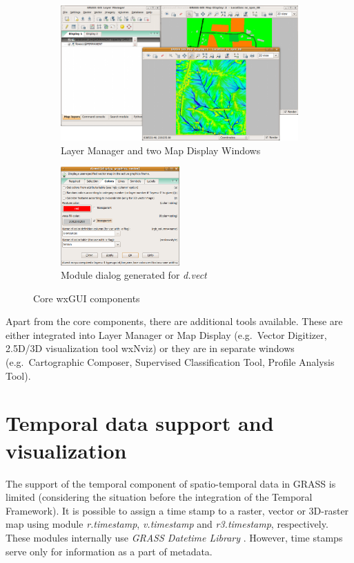 \documentclass[a4paper,12pt,oneside]{book}
\newcommand{\module}[1]{\textsl{#1}}
\begin{document}
\begin{figure}[ht!]
\centering
    \begin{subfigure}[ht]{\textwidth}
    \centering
        \includegraphics[width=\textwidth]{./images/wxGUI_1.png}
    \caption{Layer Manager and two Map Display Windows}
    \label{fig:wxGUI1}
    \end{subfigure}

\vspace{10pt}

    \begin{subfigure}[ht]{\textwidth}
    \centering
        \includegraphics[width=0.5\textwidth]{./images/wxGUI_2.png}
    \caption{Module dialog generated for \module{d.vect}}
    \label{fig:wxGUI2}
    \end{subfigure}
\caption{Core wxGUI components}
\label{fig:wxGUI}
\end{figure}

Apart from the core components, there are additional tools available.
These are either integrated into Layer Manager or Map Display
(e.g.\ Vector Digitizer, 2.5D/3D visualization tool wxNviz) or they are in separate windows
(e.g.\ Cartographic Composer, Supervised Classification Tool, Profile Analysis Tool).

\section{Temporal data support and visualization}
The support of the temporal component of spatio-temporal data in GRASS is limited
(considering the situation before the integration of the Temporal Framework).
It is possible to assign a time stamp to a raster, vector or 3D-raster map using module
\module{r.timestamp}, \module{v.timestamp} and \module{r3.timestamp}, respectively.
These modules internally use \emph{GRASS Datetime Library} \cite{grassProgMan}.
However, time stamps serve only for information as a part of metadata.
\end{document}
